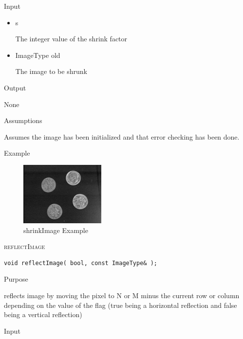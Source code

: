 \documentclass[pdftex, 11pt]{article}
\begin{document}
\begin{description}
\begin{description}
			\item{Input}

				\begin{itemize}

					\item{s}

						The integer value of the shrink factor

					\item{ImageType old}

						The image to be shrunk

				\end{itemize}

			\item{Output}

				None

			\item{Assumptions}

				Assumes the image has been initialized and that error
				checking has been done.

			\item{Example}

				\begin{figure}[ht!]
					\centering
					\caption{shrinkImage Example}
				\includegraphics{images/outshrink.png}
			\end{figure}

		\end{description}


	\item{\textsc{reflectImage}}
		\begin{description}

\begin{lstlisting}
void reflectImage( bool, const ImageType& );
\end{lstlisting}

			\item{Purpose}

				reflects image by moving the pixel to N or M
				minus the current row or column
				depending on the value of the flag
				(true being a horizontal reflection and
				false being a vertical reflection)

			\item{Input}


\end{description}
\end{description}
\end{document}
